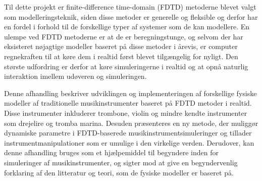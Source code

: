 Til dette projekt er finite-difference time-domain (FDTD) metoderne blevet valgt som modelleringsteknik, siden disse metoder er generelle og fleksible og derfor har en fordel i forhold til de forskellige typer af systemer som de kan modellere.  En ulempe ved FDTD metoderne er at de er beregningstunge, og selvom der har eksisteret n{\o}jagtige modeller baseret p{\aa} disse metoder i {\aa}revis, er computer regnekraften til at k{\o}re dem i realtid f{\o}rst blevet tilg{\ae}ngelig for nyligt. Den st{\o}rste udfordring er derfor at k{\o}re simuleringerne i realtid og at opn{\aa} naturlig interaktion imellem ud{\o}veren og simuleringen. 

Denne afhandling beskriver udviklingen og implementeringen af forskellige fysiske modeller af traditionelle musikinstrumenter baseret p{\aa} FDTD metoder i realtid. Disse instrumenter inkluderer trombone, violin og mindre kendte instrumenter som drejelire og tromba marina. Desuden pr{\ae}senteres en ny metode, der muligg{\o}r dynamiske parametre i FDTD-baserede musikinstrumentsimuleringer og tillader instrumentmanipulationer som er umulige i den virkelige verden. 
Derudover, kan denne afhandling bruges som et hj{\ae}lpemiddel til begyndere inden for simuleringer af musikinstrumenter, og sigter mod at give en begyndervenlig forklaring af den litteratur og teori, som de fysiske modeller er baseret p{\aa}. 
